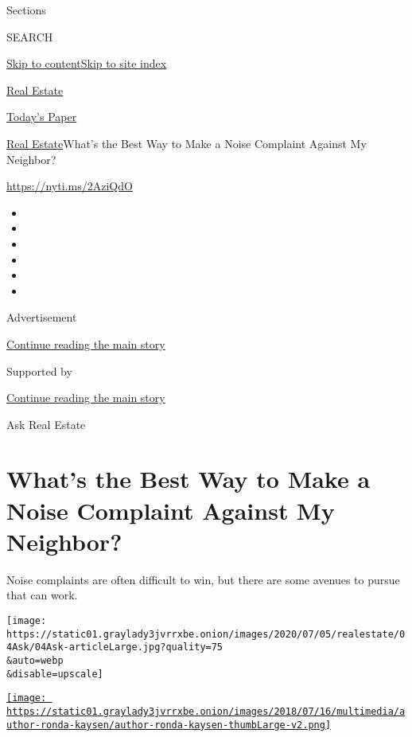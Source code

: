 Sections

SEARCH

\protect\hyperlink{site-content}{Skip to
content}\protect\hyperlink{site-index}{Skip to site index}

\href{https://www.nytimes3xbfgragh.onion/section/realestate}{Real
Estate}

\href{https://myaccount.nytimes3xbfgragh.onion/auth/login?response_type=cookie\&client_id=vi}{}

\href{https://www.nytimes3xbfgragh.onion/section/todayspaper}{Today's
Paper}

\href{/section/realestate}{Real Estate}\textbar{}What's the Best Way to
Make a Noise Complaint Against My Neighbor?

\url{https://nyti.ms/2AziQdO}

\begin{itemize}
\item
\item
\item
\item
\item
\item
\end{itemize}

Advertisement

\protect\hyperlink{after-top}{Continue reading the main story}

Supported by

\protect\hyperlink{after-sponsor}{Continue reading the main story}

Ask Real Estate

\hypertarget{whats-the-best-way-to-make-a-noise-complaint-against-my-neighbor}{%
\section{What's the Best Way to Make a Noise Complaint Against My
Neighbor?}\label{whats-the-best-way-to-make-a-noise-complaint-against-my-neighbor}}

Noise complaints are often difficult to win, but there are some avenues
to pursue that can work.

\texttt{[image: https://static01.graylady3jvrrxbe.onion/images/2020/07/05/realestate/04Ask/04Ask-articleLarge.jpg?quality=75\\\&auto=webp\\\&disable=upscale]}

\href{https://www.nytimes3xbfgragh.onion/by/ronda-kaysen}{\texttt{[image: https://static01.graylady3jvrrxbe.onion/images/2018/07/16/multimedia/author-ronda-kaysen/author-ronda-kaysen-thumbLarge-v2.png]}}

